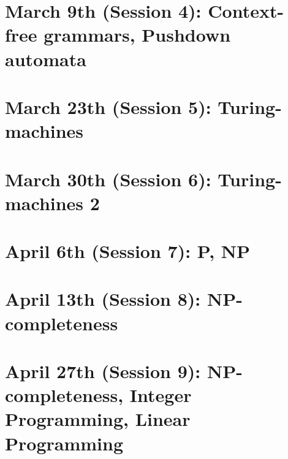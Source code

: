\documentclass[a4paper]{article}
\begin{document}
\section{March 9th (Session 4): Context-free grammars, Pushdown automata}
\pagebreak
\pagebreak
\pagebreak
\pagebreak
\pagebreak
\pagebreak
\pagebreak
\pagebreak
\pagebreak
\pagebreak
\pagebreak
\pagebreak

\section{March 23th (Session 5): Turing-machines}
\pagebreak
\pagebreak
\pagebreak
\pagebreak
\pagebreak
\pagebreak
\pagebreak
\pagebreak
\pagebreak

\section{March 30th (Session 6): Turing-machines 2}
\pagebreak
\pagebreak
\pagebreak
\pagebreak
\pagebreak
\pagebreak
\pagebreak
\pagebreak

\section{April 6th (Session 7): P, NP}
\pagebreak
\pagebreak
\pagebreak
\pagebreak
\pagebreak
\pagebreak
\pagebreak
\pagebreak
\pagebreak

\section{April 13th (Session 8): NP-completeness}
\pagebreak
\pagebreak
\pagebreak
\pagebreak
\pagebreak
\pagebreak
\pagebreak
\pagebreak
\pagebreak
\pagebreak
\pagebreak
\pagebreak
\pagebreak

\section{April 27th (Session 9): NP-completeness, Integer Programming, Linear Programming}
\pagebreak
\end{document}
